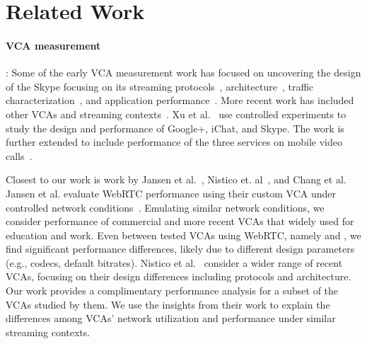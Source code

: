 \section{Related Work}\label{sec:related}

\paragraph{VCA measurement}: Some of the early VCA measurement work has focused on uncovering the design of the Skype focusing on its streaming protocols~\cite{baset2004analysis}, architecture~\cite{guha2005experimental}, traffic characterization~\cite{bonfiglio2008tracking}, and application performance~\cite{hossfeld2008analysis}. More recent work has included other VCAs and streaming contexts~\cite{xu2012video, yu2014can, azfar2016android}. Xu et al.~\cite{xu2012video} use controlled experiments to study the design and performance of Google+, iChat, and Skype. The work is further extended to include performance of the three services on mobile video calls~\cite{yu2014can}. 

Closest to our work is work by Jansen et al.~\cite{jansen2018performance}, Nistico et. al~\cite{nistico2020comparative}, and Chang et al. Jansen et al. evaluate WebRTC performance using their custom VCA under controlled network conditions~\cite{jansen2018performance}. Emulating similar network conditions, we consider performance of commercial and more recent VCAs that widely used for education and work. Even between tested VCAs using WebRTC, namely \meet and \teamsbrowser, we find significant performance differences, likely due to different design parameters (e.g., codecs, default bitrates). Nistico et al.~\cite{nistico2020comparative} consider a wider range of recent VCAs, focusing on their design differences including protocols and architecture. Our work provides a complimentary performance analysis for a subset of the VCAs studied by them. We use the insights from their work to explain the differences among VCAs' network utilization and performance under similar streaming contexts. 

